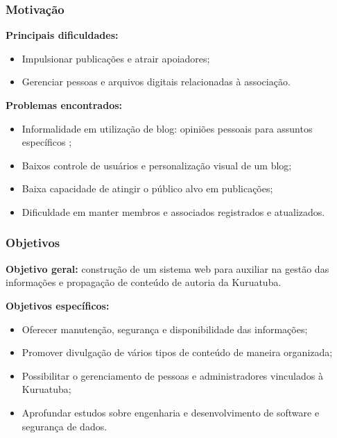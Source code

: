 \documentclass{beamer}
\begin{document}
\begin{frame}
    \frametitle{Motivação}
    \textbf{Principais dificuldades:}
    \begin{itemize}
     \item Impulsionar publicações e atrair apoiadores;
     \item Gerenciar pessoas e arquivos digitais relacionadas à associação.
    \end{itemize}

    
    \textbf{Problemas encontrados:}
    \begin{itemize}
        \item Informalidade em utilização de blog: opiniões pessoais para assuntos específicos \cite{centeno2017pampatur};
        \item Baixos controle de usuários e personalização visual de um blog; %
        \item Baixa capacidade de atingir o público alvo em publicações; %
        \item Dificuldade em manter membros e associados registrados e atualizados.
    \end{itemize}

\end{frame}


\begin{frame}
    \frametitle{Objetivos}
    \textbf{Objetivo geral:} construção de um sistema web para auxiliar na gestão das informações e propagação de conteúdo de autoria da Kuruatuba.
    
    \textbf{Objetivos específicos:}
    \begin{itemize}
        \item Oferecer manutenção, segurança e disponibilidade das informações;
        \item Promover divulgação de vários tipos de conteúdo de maneira organizada;
        \item Possibilitar o gerenciamento de pessoas e administradores vinculados à Kuruatuba;
        \item Aprofundar estudos sobre engenharia e desenvolvimento de software e segurança de dados.
    \end{itemize}
\end{frame}


\end{document}
